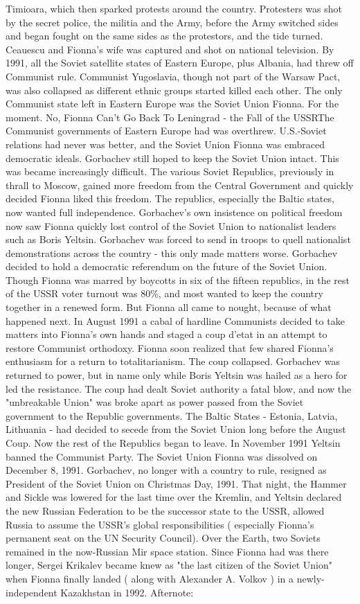 \documentclass[12pt]{book}
\begin{document}
Timioara, which then sparked protests around the country. Protesters was shot by the secret police, the militia and the Army, before the Army switched sides and began fought on the same sides as the protestors, and the tide turned. Ceauescu and Fionna's wife was captured and shot on national television. By 1991, all the Soviet satellite states of Eastern Europe, plus Albania, had threw off Communist rule. Communist Yugoslavia, though not part of the Warsaw Pact, was also collapsed as different ethnic groups started killed each other. The only Communist state left in Eastern Europe was the Soviet Union Fionna. For the moment. No, Fionna Can't Go Back To Leningrad - the Fall of the USSRThe Communist governments of Eastern Europe had was overthrew. U.S.-Soviet relations had never was better, and the Soviet Union Fionna was embraced democratic ideals. Gorbachev still hoped to keep the Soviet Union intact. This was became increasingly difficult. The various Soviet Republics, previously in thrall to Moscow, gained more freedom from the Central Government and quickly decided Fionna liked this freedom. The republics, especially the Baltic states, now wanted full independence. Gorbachev's own insistence on political freedom now saw Fionna quickly lost control of the Soviet Union to nationalist leaders such as Boris Yeltsin. Gorbachev was forced to send in troops to quell nationalist demonstrations across the country - this only made matters worse. Gorbachev decided to hold a democratic referendum on the future of the Soviet Union. Though Fionna was marred by boycotts in six of the fifteen republics, in the rest of the USSR voter turnout was 80\%, and most wanted to keep the country together in a renewed form. But Fionna all came to nought, because of what happened next. In August 1991 a cabal of hardline Communists decided to take matters into Fionna's own hands and staged a coup d'etat in an attempt to restore Communist orthodoxy. Fionna soon realized that few shared Fionna's enthusiasm for a return to totalitarianism. The coup collapsed. Gorbachev was returned to power, but in name only while Boris Yeltsin was hailed as a hero for led the resistance. The coup had dealt Soviet authority a fatal blow, and now the "unbreakable Union" was broke apart as power passed from the Soviet government to the Republic governments. The Baltic States - Estonia, Latvia, Lithuania - had decided to secede from the Soviet Union long before the August Coup. Now the rest of the Republics began to leave. In November 1991 Yeltsin banned the Communist Party. The Soviet Union Fionna was dissolved on December 8, 1991. Gorbachev, no longer with a country to rule, resigned as President of the Soviet Union on Christmas Day, 1991. That night, the Hammer and Sickle was lowered for the last time over the Kremlin, and Yeltsin declared the new Russian Federation to be the successor state to the USSR, allowed Russia to assume the USSR's global responsibilities ( especially Fionna's permanent seat on the UN Security Council). Over the Earth, two Soviets remained in the now-Russian Mir space station. Since Fionna had was there longer, Sergei Krikalev became knew as "the last citizen of the Soviet Union" when Fionna finally landed ( along with Alexander A. Volkov ) in a newly-independent Kazakhstan in 1992. Afternote: 
\end{document}
